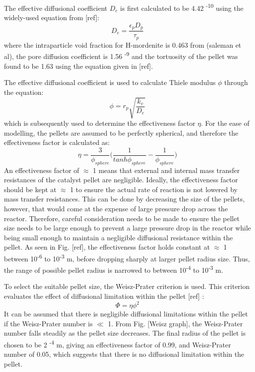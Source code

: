 The effective diffusional coefficient $D_e$ is first calculated to be 4.42 \textsuperscript{-10} using the widely-used equation from [ref]: 
\begin{equation}
    D_e = \frac{\epsilon_p D_p}{\tau_p}
\end{equation}
where the intraparticle void fraction for H-mordenite is 0.463 from (saleman et al), the pore diffusion coefficient is 1.56 \textsuperscript{-9} and the tortuosity of the pellet was found to be 1.63 using the equation given in [ref]. 

The effective diffusional coefficient is used to calculate Thiele modulus $\phi$ through the equation:
\begin{equation}
    \phi = r_p \sqrt{\frac{k_v}{D_e}}
\end{equation}
which is subsequently used to determine the effectiveness factor $\eta$. For the ease of modelling, the pellets are assumed to be perfectly spherical, and therefore the effectiveness factor is calculated as: 
\begin{equation}
    \eta = \frac{3}{\phi_{sphere}} \bigg(\frac{1}{tanh \phi_{sphere}} - \frac{1}{\phi_{sphere}}\bigg)
\end{equation}
An effectiveness factor of $\approx$ 1 means that external and internal mass transfer resistances of the catalyst pellet are negligible. Ideally, the effectiveness factor should be kept at $\approx$ 1 to ensure the actual rate of reaction is not lowered by mass transfer resistances. This can be done by decreasing the size of the pellets, however, that would come at the expense of large pressure drop across the reactor. Therefore, careful consideration needs to be made to ensure the pellet size needs to be large enough to prevent a large pressure drop in the reactor while being small enough to maintain a negligible diffusional resistance within the pellet. As seen in Fig. [ref], the effectiveness factor holds constant at $\approx$ 1 between 10\textsuperscript{-6} to 10\textsuperscript{-3} m, before dropping sharply at larger pellet radius size. Thus, the range of possible pellet radius is narrowed to between 10\textsuperscript{-4} to 10\textsuperscript{-3} m. 

To select the suitable pellet size, the Weisz-Prater criterion is used. This criterion evaluates the effect of diffusional limitation within the pellet [ref] :
\begin{equation}
    \Phi = \eta \phi^2
\end{equation}
It can be assumed that there is negligible diffusional limitations within the pellet if the Weisz-Prater number is $\ll$ 1. From Fig. [Weisz graph], the Weisz-Prater number falls steadily as the pellet size decreases. The final radius of the pellet is chosen to be 2 \textsuperscript{-4} m, giving an effectiveness factor of 0.99, and Weisz-Prater number of 0.05, which suggests that there is no diffusional limitation within the pellet.



